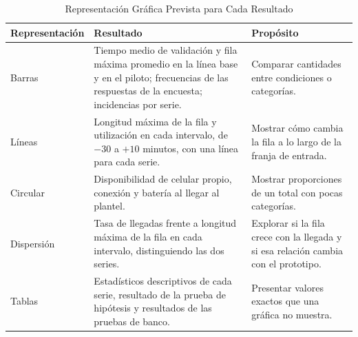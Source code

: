 \begin{table}[tbp]
	\caption{Representación Gráfica Prevista para Cada Resultado}
	\label{tab:graficas-metodo}
	\small\linespread{1}\selectfont
	\begin{tabular}{@{}P{3cm}P{6.6cm}P{5.9cm}@{}}
		\toprule
		Representación & Resultado                                                                                     & Propósito                                                          \\
		\midrule
		Barras         & Tiempo medio de validación y fila máxima promedio en la línea base y en el piloto; frecuencias de las respuestas de la encuesta; incidencias por serie. & Comparar cantidades entre condiciones o categorías.               \\[0.5em]
		Líneas         & Longitud máxima de la fila y utilización en cada intervalo, de $-30$ a $+10$ minutos, con una línea para cada serie. & Mostrar cómo cambia la fila a lo largo de la franja de entrada.    \\[0.5em]
		Circular       & Disponibilidad de celular propio, conexión y batería al llegar al plantel.                    & Mostrar proporciones de un total con pocas categorías.             \\[0.5em]
		Dispersión     & Tasa de llegadas frente a longitud máxima de la fila en cada intervalo, distinguiendo las dos series. & Explorar si la fila crece con la llegada y si esa relación cambia con el prototipo. \\[0.5em]
		Tablas         & Estadísticos descriptivos de cada serie, resultado de la prueba de hipótesis y resultados de las pruebas de banco. & Presentar valores exactos que una gráfica no muestra.              \\
		\bottomrule
	\end{tabular}
\end{table}
